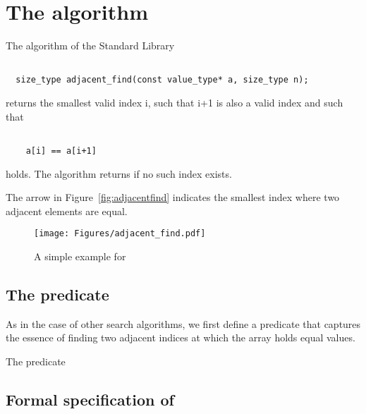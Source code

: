 
\section{The \adjacentfind algorithm}

The \adjacentfind
algorithm of the \cxx Standard Library \cite[\S 28.5.8]{cxx-17-draft}

\begin{lstlisting}[style=acsl-block]

  size_type adjacent_find(const value_type* a, size_type n);
\end{lstlisting}

returns the smallest valid index i, such that i+1 is also a valid index 
and such that 
\begin{lstlisting}[style=acsl-block]

    a[i] == a[i+1]

\end{lstlisting}
holds. 
The \adjacentfind algorithm returns  if no such index exists.


The arrow in Figure~\ref{fig:adjacentfind} indicates the smallest index
where two adjacent elements are equal.

\begin{figure}[hbt]
\centering
\texttt{[image: Figures/adjacent\_find.pdf]}
\caption{A simple example for \adjacentfind}
\end{figure}

\FloatBarrier


\subsection{The predicate \HasEqualNeighbors}

As in the case of other search algorithms, we first define 
a predicate 
that captures 
the essence of finding two adjacent indices at which the array holds equal values.

\begin{logic}[hbt]
\begin{minipage}{0.99\textwidth}

\end{minipage}
\caption{The predicate \HasEqualNeighbors}
\end{logic}

\subsection{Formal specification of \adjacentfind}

